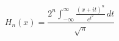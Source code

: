 \documentclass{article}
\begin{document}
\[H_n(x)=\frac{2^n \int_{-\infty }^{\infty } \frac{(x+i t)^n}{e^{t^2}} \, dt}{\sqrt{\pi }}\]
\end{document}
